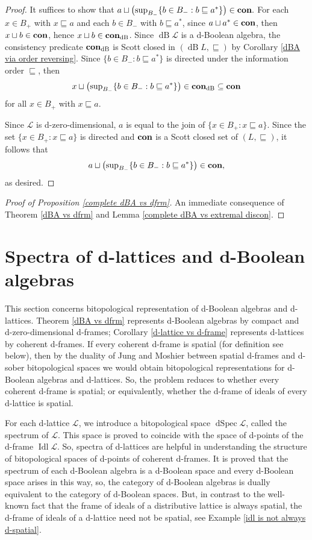 \documentclass[11pt]{article}
\DeclareMathOperator{\idl}{Idl}
\DeclareMathOperator{\dB}{dB}
\DeclareMathOperator{\dSpec}{dSpec}
\theoremstyle{plain}
\theoremstyle{definition}
\begin{document}
\begin{proof}
It suffices to show that  $a\sqcup \big({\sup}_{B_-}\{b\in B_-:b\sqsubseteq a^*\}\big)\in{\bf con}.$ 
For each $x\in B_{+}$ with $x\sqsubseteq a$ and each $b\in B_{-}$ with $b\sqsubseteq a^*$, since $a\sqcup a^*\in{\bf con}$, then $x\sqcup b\in{\bf con}$, hence $x\sqcup b\in{\bf con}_{\dB}$. Since  $\dB\mathcal{L}$ is a d-Boolean algebra, the consistency predicate ${\bf con}_{\dB}$ is Scott closed in $(\dB L,\sqsubseteq)$ by Corollary \ref{dBA via order reversing}.  Since $\{b\in B_-:b\sqsubseteq a^*\}$ is directed under the information order $\sqsubseteq$, then $$x\sqcup\big({\sup}_{B_-}\{b\in B_-:b\sqsubseteq a^*\}\big)\in {\bf con}_{\dB}\subseteq{\bf con}$$ for all $x\in B_{+}$ with $x\sqsubseteq a$.   

Since $\mathcal{L}$ is d-zero-dimensional,   $a$ is equal to the join of $\{x\in B_{+}:x\sqsubseteq a\}.$   Since the set $\{x\in B_+:x\sqsubseteq a\}$ is  directed  and ${\bf con}$ is a Scott closed set of $(L,\sqsubseteq)$,   it follows that $$a\sqcup\big({\sup}_{B_-}\{b\in B_-:b\sqsubseteq a^*\}\big)\in{\bf con}, $$ as desired.  \end{proof}

\begin{proof}[Proof of Proposition \ref{complete dBA vs dfrm}] 
An immediate consequence of Theorem \ref{dBA vs dfrm} and Lemma \ref{complete dBA vs extremal discon}. \end{proof}
   
  
\section{Spectra of d-lattices and d-Boolean algebras} \label{d-spectrum}

This section concerns bitopological representation of d-Boolean algebras and d-lattices. Theorem \ref{dBA vs dfrm} represents d-Boolean algebras by compact and d-zero-dimensional d-frames;   Corollary \ref{d-lattice vs d-frame} represents d-lattices by coherent d-frames. If every coherent d-frame is spatial (for definition see below), then by the duality of Jung and Moshier \cite{JM2006,JM2008} between spatial d-frames and d-sober bitopological spaces  we would obtain bitopological representations for d-Boolean algebras and d-lattices. So, the problem reduces to whether every coherent d-frame is spatial; or equivalently, whether the d-frame of ideals of every d-lattice is spatial.

For each d-lattice $\mathcal{L}$, we introduce a bitopological space $\dSpec\mathcal{L}$, called the spectrum of $\mathcal{L}$. This space is proved to coincide with the space of d-points of the d-frame $\idl\mathcal{L}$. So, spectra of d-lattices are helpful in understanding the structure of bitopological spaces of d-points of coherent d-frames.  
It is proved that the spectrum of each  d-Boolean algebra is a d-Boolean space and every d-Boolean space arises in this way, so, the category of d-Boolean algebras is dually equivalent to the category of d-Boolean spaces. But, in contrast to the well-known fact that the frame of ideals of a distributive lattice is always spatial, the d-frame of ideals of a d-lattice need not be spatial, see Example \ref{idl is not always d-spatial}. 
  
\end{document}

